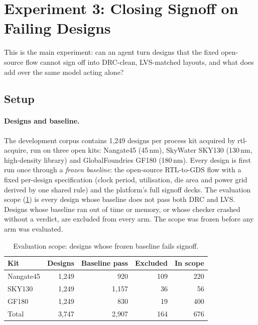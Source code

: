 \section{Experiment 3: Closing Signoff on Failing Designs}
\label{sec:exp3}

This is the main experiment: can an agent turn designs that the fixed open-source flow cannot sign
off into DRC-clean, LVS-matched layouts, and what does \R add over the same model acting alone?

\subsection{Setup}

\paragraph{Designs and baseline.}
The development corpus contains 1{,}249 designs per process kit acquired by rtl-acquire, run on three
open kits: Nangate45 (45\,nm), SkyWater SKY130 (130\,nm, high-density library) and GlobalFoundries
GF180 (180\,nm). Every design is first run once through a \emph{frozen baseline}: the open-source
RTL-to-GDS flow with a fixed per-design specification (clock period, utilisation, die area and power
grid derived by one shared rule) and the platform's full signoff decks. The evaluation scope
(\cref{tab:scope}) is every design whose baseline does not pass both DRC and LVS. Designs whose
baseline ran out of time or memory, or whose checker crashed without a verdict, are excluded from
every arm. The scope was frozen before any arm was evaluated.

\begin{table}[t]
  \centering\small
  \setlength{\tabcolsep}{4pt}
  \begin{tabular}{@{}lrrrr@{}}
    \toprule
    Kit & Designs & Baseline pass & Excluded & In scope \\
    \midrule
    Nangate45 & 1{,}249 & 920 & 109 & 220 \\
    SKY130    & 1{,}249 & 1{,}157 & 36 & 56 \\
    GF180     & 1{,}249 & 830 & 19 & 400 \\
    \midrule
    Total     & 3{,}747 & 2{,}907 & 164 & 676 \\
    \bottomrule
  \end{tabular}
  \caption{Evaluation scope: designs whose frozen baseline fails signoff.}
  \label{tab:scope}
\end{table}

